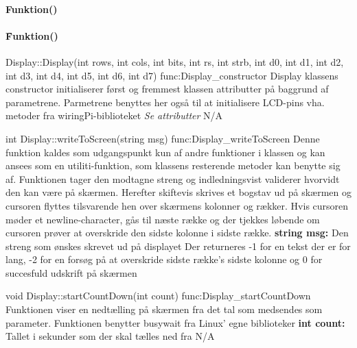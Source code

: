 \paragraph{Funktion()}

\paragraph{\~Funktion()}
\begin{functionDescription}
{Display::Display(int rows, int cols, int bits, int rs, int strb, int d0, int d1, int d2, int d3, int d4, int d5, int d6, int d7)}
{func:Display_constructor}
{Display klassens constructor initialiserer først og fremmest klassen attributter på baggrund af parametrene. Parmetrene benyttes her også til at initialisere LCD-pins vha. metoder fra wiringPi-biblioteket}
{\textit{Se attributter}}
{N/A}
\end{functionDescription}

\begin{functionDescription}
{int Display::writeToScreen(string msg)}
{func:Display_writeToScreen}
{Denne funktion kaldes som udgangspunkt kun af andre funktioner i klassen og kan ansees som en utiliti-funktion, som klassens resterende metoder kan benytte sig af. Funktionen tager den modtagne streng og indledningsvist validerer hvorvidt den kan være på skærmen. Herefter skiftevis skrives et bogstav ud på skærmen og cursoren flyttes tilsvarende hen over skærmens kolonner og rækker. Hvis cursoren møder et newline-character, gås til næste række og der tjekkes løbende om cursoren prøver at overskride den sidste kolonne i sidste række.}
{\textbf{string msg:} Den streng som ønskes skrevet ud på displayet}
{Der returneres -1 for en tekst der er for lang, -2 for en forsøg på at overskride sidste række's sidste kolonne og 0 for succesfuld udskrift på skærmen}
\end{functionDescription}

\begin{functionDescription}
{void Display::startCountDown(int count)}
{func:Display_startCountDown}
{Funktionen viser en nedtælling på skærmen fra det tal som medsendes som parameter. Funktionen benytter busywait fra Linux' egne biblioteker}
{\textbf{int count:} Tallet i sekunder som der skal tælles ned fra}
{N/A}
\end{functionDescription}

